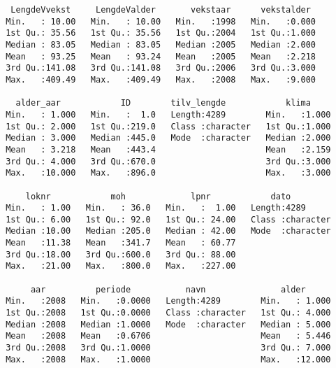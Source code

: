 \documentclass[
]{article}
\begin{document}
\begin{verbatim}
  LengdeVvekst     LengdeValder       vekstaar      vekstalder   
 Min.   : 10.00   Min.   : 10.00   Min.   :1998   Min.   :0.000  
 1st Qu.: 35.56   1st Qu.: 35.56   1st Qu.:2004   1st Qu.:1.000  
 Median : 83.05   Median : 83.05   Median :2005   Median :2.000  
 Mean   : 93.25   Mean   : 93.24   Mean   :2005   Mean   :2.218  
 3rd Qu.:141.08   3rd Qu.:141.08   3rd Qu.:2006   3rd Qu.:3.000  
 Max.   :409.49   Max.   :409.49   Max.   :2008   Max.   :9.000  
                                                                 
   alder_aar            ID        tilv_lengde            klima      
 Min.   : 1.000   Min.   :  1.0   Length:4289        Min.   :1.000  
 1st Qu.: 2.000   1st Qu.:219.0   Class :character   1st Qu.:1.000  
 Median : 3.000   Median :445.0   Mode  :character   Median :2.000  
 Mean   : 3.218   Mean   :443.4                      Mean   :2.159  
 3rd Qu.: 4.000   3rd Qu.:670.0                      3rd Qu.:3.000  
 Max.   :10.000   Max.   :896.0                      Max.   :3.000  
                                                                    
     loknr            moh             lpnr            dato          
 Min.   : 1.00   Min.   : 36.0   Min.   :  1.00   Length:4289       
 1st Qu.: 6.00   1st Qu.: 92.0   1st Qu.: 24.00   Class :character  
 Median :10.00   Median :205.0   Median : 42.00   Mode  :character  
 Mean   :11.38   Mean   :341.7   Mean   : 60.77                     
 3rd Qu.:18.00   3rd Qu.:600.0   3rd Qu.: 88.00                     
 Max.   :21.00   Max.   :800.0   Max.   :227.00                     
                                                                    
      aar          periode           navn               alder       
 Min.   :2008   Min.   :0.0000   Length:4289        Min.   : 1.000  
 1st Qu.:2008   1st Qu.:0.0000   Class :character   1st Qu.: 4.000  
 Median :2008   Median :1.0000   Mode  :character   Median : 5.000  
 Mean   :2008   Mean   :0.6706                      Mean   : 5.446  
 3rd Qu.:2008   3rd Qu.:1.0000                      3rd Qu.: 7.000  
 Max.   :2008   Max.   :1.0000                      Max.   :12.000  
                                                                    

\end{verbatim}
\end{document}
